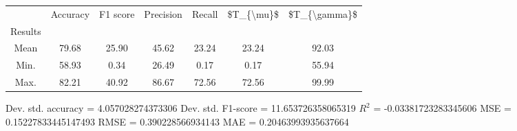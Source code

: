 \begin{tabular}{|c|c|c|c|c|c|c|}
\toprule
{} &  Accuracy &  F1 score &  Precision &  Recall &  \$T\_\{\textbackslash mu\}\$ &  \$T\_\{\textbackslash gamma\}\$ \\
Results &           &           &            &         &            &               \\
\hline
Mean    &     79.68 &     25.90 &      45.62 &   23.24 &      23.24 &         92.03 \\
Min.    &     58.93 &      0.34 &      26.49 &    0.17 &       0.17 &         55.94 \\
Max.    &     82.21 &     40.92 &      86.67 &   72.56 &      72.56 &         99.99 \\
\bottomrule
\end{tabular}

 Dev. std. accuracy = 4.057028274373306
 Dev. std. F1-score = 11.653726358065319
 $R^2$ = -0.03381723283345606
 MSE = 0.15227833445147493
 RMSE = 0.390228566934143
 MAE = 0.20463993935637664
